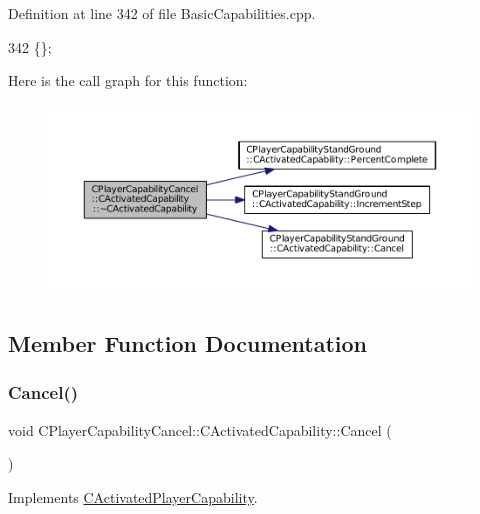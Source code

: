 Definition at line 342 of file Basic\+Capabilities.\+cpp.


\begin{DoxyCode}
342 \{\};
\end{DoxyCode}
Here is the call graph for this function\+:
\nopagebreak
\begin{figure}[H]
\begin{center}
\leavevmode
\includegraphics[width=350pt]{classCPlayerCapabilityCancel_1_1CActivatedCapability_ae0d7d8f36d4ac21c04d68dc6ad2ae9c4_cgraph}
\end{center}
\end{figure}


\subsection{Member Function Documentation}
\hypertarget{classCPlayerCapabilityCancel_1_1CActivatedCapability_accd67b449574b6c99e21f522d13bc96a}{}\label{classCPlayerCapabilityCancel_1_1CActivatedCapability_accd67b449574b6c99e21f522d13bc96a} 
\subsubsection{\texorpdfstring{Cancel()}{Cancel()}}
{\footnotesize\ttfamily void C\+Player\+Capability\+Cancel\+::\+C\+Activated\+Capability\+::\+Cancel (\begin{DoxyParamCaption}{ }\end{DoxyParamCaption})\hspace{0.3cm}{\ttfamily [virtual]}}



Implements \hyperlink{classCActivatedPlayerCapability_a5cde83be468e262ad054d81e28684a81}{C\+Activated\+Player\+Capability}.



